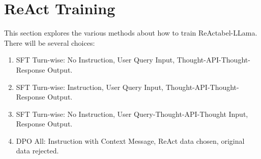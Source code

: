 \section{ReAct Training}
This section explores the various methods about how to train  ReActabel-LLama. There will be several choices:
\begin{enumerate}
    \item SFT Turn-wise: No Instruction, User Query Input, Thought-API-Thought-Response Output.
    \item SFT Turn-wise: Instruction, User Query Input, Thought-API-Thought-Response Output.
    \item SFT Turn-wise: No Instruction, User Query-Thought-API-Thought Input, Response Output.
    \item DPO All: Instruction with Context Message, ReAct data chosen, original data rejected.
\end{enumerate}

